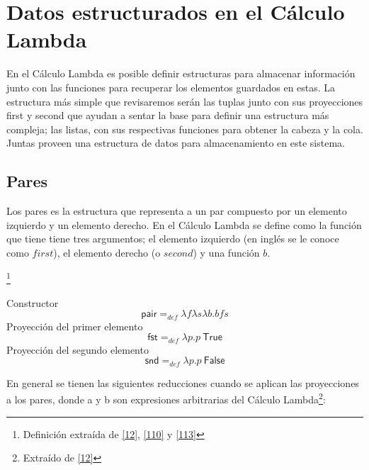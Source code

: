   \section{Datos estructurados en el Cálculo Lambda}

            En el Cálculo Lambda es posible definir estructuras para almacenar información junto con las funciones para recuperar los elementos guardados en estas. La estructura más simple que revisaremos serán las tuplas junto con sus proyecciones \textsf{first} y \textsf{second} que ayudan a sentar la base para definir una estructura más compleja; las listas, con sus respectivas funciones para obtener la cabeza y la cola. Juntas proveen una estructura de datos para almacenamiento en este sistema.
    
            \subsection{Pares}

                Los pares es la estructura que representa a un par compuesto por un elemento izquierdo y un elemento derecho. En el Cálculo Lambda se define como la función que tiene tiene tres argumentos; el elemento izquierdo (en inglés se le conoce como $first$), el elemento derecho (o $second$) y una función $b$.
        
                \begin{definition}\footnote{Definición extraída de \hyperlink{12}{[12]},  \hyperlink{110}{[110]} y   \hyperlink{113}{[113]}}
            
                    Constructor
                        $$\mathsf{pair} =_{def} \lambda f\lambda s\lambda b. bfs$$
                    Proyección del primer elemento
                        $$\mathsf{fst} =_{def} \lambda p.p \ \textsf{True}$$
                    Proyección del segundo elemento
                        $$\mathsf{snd} =_{def} \lambda p.p \ \textsf{False}$$

                \end{definition}

    En general se tienen las siguientes reducciones cuando se aplican las proyecciones a los pares, donde a y b son expresiones arbitrarias del Cálculo Lambda\footnote{Extraído de \hyperlink{12}{[12]}}:

